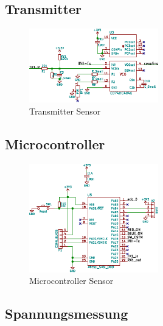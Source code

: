 \subsection{Transmitter}
\label{subsec:hw:sensor:transmitter}

\begin{figure}[h!t]
    \includegraphics[width=0.5\textwidth]{images/sensor-sch/sensor--sch--transmitter.eps}
    \caption{Transmitter Sensor}
\end{figure}

\subsection{Microcontroller}
\label{subsec:hw:sensor:mcu}

\begin{figure}[h!t]
    \includegraphics[width=0.5\textwidth]{images/sensor-sch/sensor--sch--mcu.eps}
    \caption{Microcontroller Sensor}
\end{figure}


\subsection{Spannungsmessung}
\label{subsec:hw:sensor:voltageSense}

